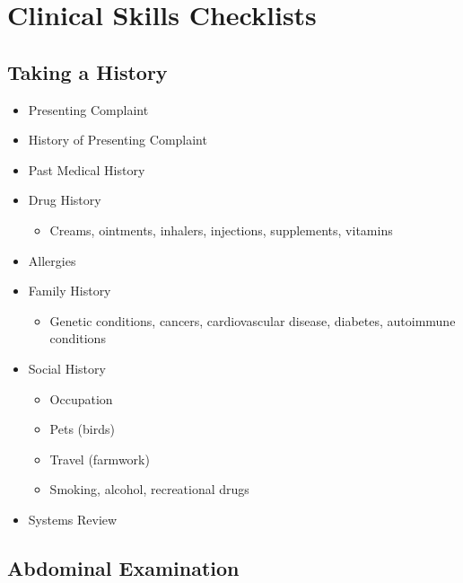 \chapter{Clinical Skills Checklists}

\section{Taking a History}


\begin{itemize}
    \item Presenting Complaint
    \item History of Presenting Complaint
    \item Past Medical History
    \item Drug History
    \begin{itemize}
        \item Creams, ointments, inhalers, injections, supplements, vitamins
    \end{itemize}
    \item Allergies
    \item Family History
    \begin{itemize}
        \item Genetic conditions, cancers, cardiovascular disease, diabetes, autoimmune conditions
    \end{itemize}
    \item Social History
    \begin{itemize}
        \item Occupation
        \item Pets (birds)
        \item Travel (farmwork)
        \item Smoking, alcohol, recreational drugs
    \end{itemize}
    \item Systems Review
\end{itemize}


\clearpage
\section{Abdominal Examination}
\label{sec:abdominal-examination}


